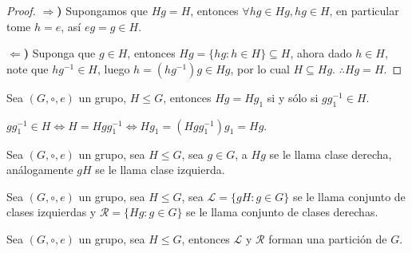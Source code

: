 
\begin{proof}
	\textbf{$\Rightarrow$)} Supongamos que $Hg = H$, entonces $\forall hg \in Hg, hg \in H$, en particular tome $h=e$, así $eg = g \in H$.

	\textbf{$\Leftarrow$)} Suponga que $g \in H$, entonces $Hg = \{ hg : h \in H \} \subseteq H$, ahora dado $h \in H$, note que $hg^{-1} \in H$, luego $h = (hg^{-1})g \in Hg$, por lo cual $H \subseteq Hg$.
	$\therefore Hg = H$.
\end{proof}

\begin{prop}
	Sea $(G, \circ, e)$ un grupo, $H \le G$, entonces $Hg = Hg_1$ si y sólo si $gg_1^{-1} \in H$.
\end{prop}

\begin{enefecto}
	$gg_1^{-1} \in H \iff H = Hgg_1^{-1} \iff Hg_1 = (Hgg_1^{-1})g_1 = Hg$.
\end{enefecto}

\begin{defi}
	Sea $(G, \circ, e)$ un grupo, sea $H \le G$, sea $g \in G$, a $Hg$ se le llama clase derecha, análogamente $gH$ se le llama clase izquierda.
\end{defi}

\begin{defi}
	Sea $(G, \circ, e)$ un grupo, sea $H \le G$, sea $\mathcal{L} = \{ gH : g \in G \}$ se le llama conjunto de clases izquierdas y $\mathcal{R} = \{ Hg : g \in G \}$ se le llama conjunto de clases derechas.
\end{defi}

\begin{prop}
	Sea $(G, \circ, e)$ un grupo, sea $H \le G$, entonces $\mathcal{L}$ y $\mathcal{R}$ forman una partición de $G$.
\end{prop}

